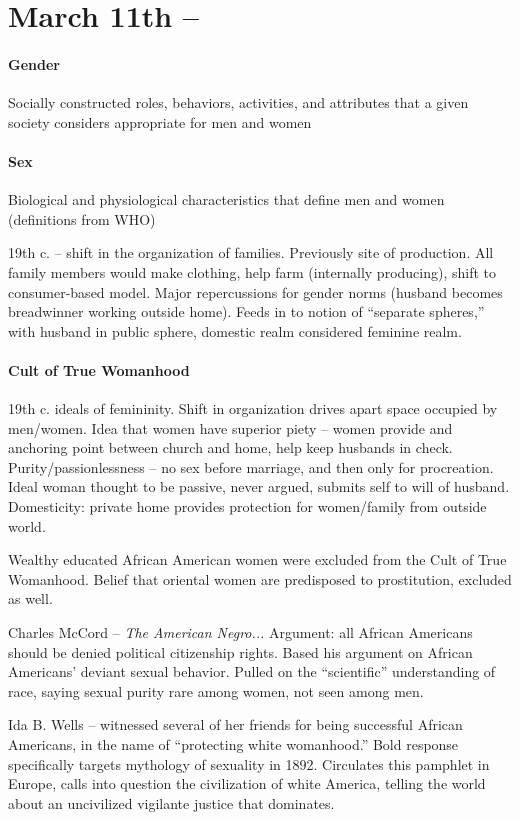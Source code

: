 \section{March 11th -- }

\paragraph{Gender} Socially constructed roles, behaviors, activities, and attributes that a given society considers appropriate for men and women

\paragraph{Sex} Biological and physiological characteristics that define men and women (definitions from WHO)

19th c. -- shift in the organization of families. Previously site of production. All family members would make clothing, help farm (internally producing), shift to consumer-based model. Major repercussions for gender norms (husband becomes breadwinner working outside home). Feeds in to notion of ``separate spheres,'' with husband in public sphere, domestic realm considered feminine realm.

\paragraph{Cult of True Womanhood} 19th c. ideals of femininity. Shift in organization drives apart space occupied by men/women. Idea that women have superior piety -- women provide and anchoring point between church and home, help keep husbands in check. Purity/passionlessness -- no sex before marriage, and then only for procreation. Ideal woman thought to be passive, never argued, submits self to will of husband. Domesticity: private home provides protection for women/family from outside world.

Wealthy educated African American women were excluded from the Cult of True Womanhood. Belief that oriental women are predisposed to prostitution, excluded as well.

Charles McCord -- \textit{The American Negro...} Argument: all African Americans should be denied political citizenship rights. Based his argument on African Americans' deviant sexual behavior. Pulled on the ``scientific'' understanding of race, saying sexual purity rare among women, not seen among men.

Ida B. Wells -- witnessed several of her friends for being successful African Americans, in the name of ``protecting white womanhood.'' Bold response specifically targets mythology of sexuality in 1892. Circulates this pamphlet in Europe, calls into question the civilization of white America, telling the world about an uncivilized vigilante justice that dominates.

